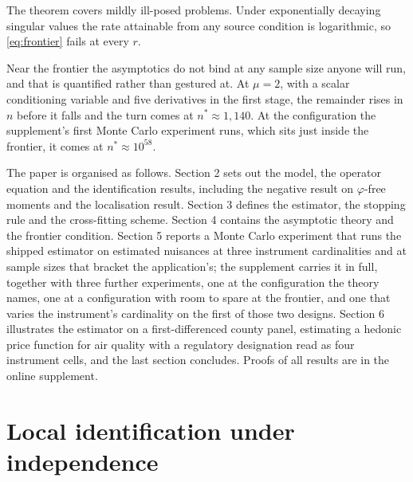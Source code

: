 \documentclass[
  12pt]{article}
\newcommand{\1}[1]{\mathds{1}\left[#1\right]}
\theoremstyle{plain}
\theoremstyle{definition}
\theoremstyle{definition}
\theoremstyle{remark}
\begin{document}
The theorem covers mildly ill-posed problems. Under exponentially
decaying singular values the rate attainable from any source condition
is logarithmic, so \eqref{eq:frontier} fails at every \(r\).

Near the frontier the asymptotics do not bind at any sample size anyone
will run, and that is quantified rather than gestured at. At \(\mu=2\),
with a scalar conditioning variable and five derivatives in the first
stage, the remainder rises in \(n\) before it falls and the turn comes
at \(n^{\ast}\approx1{,}140\). At the configuration the supplement's
first Monte Carlo experiment runs, which sits just inside the frontier,
it comes at \(n^{\ast}\approx10^{58}\).

The paper is organised as follows. Section 2 sets out the model, the
operator equation and the identification results, including the negative
result on \(\varphi\)-free moments and the localisation result. Section
3 defines the estimator, the stopping rule and the cross-fitting scheme.
Section 4 contains the asymptotic theory and the frontier condition.
Section 5 reports a Monte Carlo experiment that runs the shipped
estimator on estimated nuisances at three instrument cardinalities and
at sample sizes that bracket the application's; the supplement carries
it in full, together with three further experiments, one at the
configuration the theory names, one at a configuration with room to
spare at the frontier, and one that varies the instrument's cardinality
on the first of those two designs. Section 6 illustrates the estimator
on a first-differenced county panel, estimating a hedonic price function
for air quality with a regulatory designation read as four instrument
cells, and the last section concludes. Proofs of all results are in the
online supplement.

\section{Local identification under
independence}\label{local-identification-under-independence}


\end{document}
